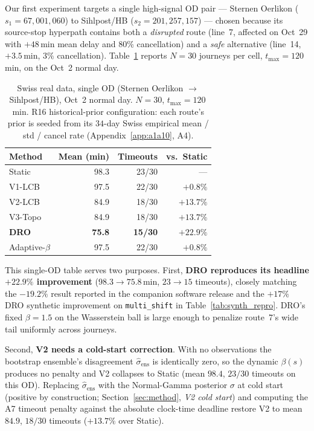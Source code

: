 \documentclass[11pt]{article}
\theoremstyle{definition}
\theoremstyle{remark}
\begin{document}
Our first experiment targets a single high-signal OD pair --- Sternen
Oerlikon ($s_1{=}67{,}001{,}060$) to Sihlpost/HB ($s_2{=}201{,}257{,}157$)
--- chosen because its source-stop hyperpath contains both a \emph{disrupted}
route (line~7, affected on Oct~29 with $+48$\,min mean delay and 80\%
cancellation) and a \emph{safe} alternative (line~14, $+3.5$\,min, $3\%$
cancellation). Table~\ref{tab:swiss_focused} reports $N{=}30$ journeys
per cell, $t_{\max}{=}120$\,min, on the Oct~2 normal day.

\begin{table}[t]
\centering
\caption{Swiss real data, single OD (Sternen Oerlikon $\to$ Sihlpost/HB),
Oct~2 normal day. $N{=}30$, $t_{\max}{=}120$\,min. R16 historical-prior
configuration: each route's prior is seeded from its $34$-day Swiss
empirical mean / std / cancel rate (Appendix~\ref{app:a1a10}, A4).}
\label{tab:swiss_focused}
\begin{tabular}{l rrr}
\toprule
Method        & Mean (min) & Timeouts & vs.\ Static \\
\midrule
Static        & 98.3 & 23/30 & --- \\
V1-LCB        & 97.5 & 22/30 & $+0.8\%$ \\
V2-LCB        & 84.9 & 18/30 & $+13.7\%$ \\
V3-Topo       & 84.9 & 18/30 & $+13.7\%$ \\
\textbf{DRO}  & \textbf{75.8} & \textbf{15/30} & $\bm{+22.9\%}$ \\
Adaptive-$\beta$ & 97.5 & 22/30 & $+0.8\%$ \\
\bottomrule
\end{tabular}
\end{table}

This single-OD table serves two purposes. First, \textbf{DRO reproduces
its headline $\bm{+22.9\%}$ improvement} ($98.3\!\to\!75.8$\,min,
$23\!\to\!15$ timeouts), closely matching the $-19.2\%$ result reported
in the companion software release and the $+17\%$ DRO synthetic
improvement on \texttt{multi\_shift} in Table~\ref{tab:synth_repro}.
DRO's fixed $\beta=1.5$ on the Wasserstein ball is large enough to
penalize route~7's wide tail uniformly across journeys.

Second, \textbf{V2 needs a cold-start correction}. With no
observations the bootstrap ensemble's disagreement
$\hat\sigma_{\mathrm{ens}}$ is identically zero, so the dynamic
$\beta(s)$ produces no penalty and V2 collapses to Static (mean
$98.4$, $23/30$ timeouts on this OD). Replacing
$\hat\sigma_{\mathrm{ens}}$ with the Normal-Gamma posterior
$\sigma$ at cold start (positive by construction;
Section~\ref{sec:method}, \emph{V2 cold start}) and computing the
A7 timeout penalty against the absolute clock-time deadline
restore V2 to mean $84.9$, $18/30$ timeouts ($+13.7\%$ over
Static).
\end{document}
